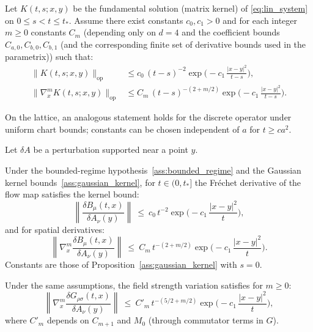 \begin{proposition}\label{ass:gaussian_kernel}
Let $K(t,s;x,y)$ be the fundamental solution (matrix kernel) of \eqref{eq:lin_system} on $0\le s<t\le t_\ast$.
Assume there exist constants $c_0,c_1>0$ and for each integer $m\ge 0$ constants $C_m$ (depending only on $d=4$ and the coefficient bounds
$C_{a,0},C_{b,0},C_{b,1}$ (and the corresponding finite set of derivative bounds used in the parametrix)) such that:
\begin{align}
\|K(t,s;x,y)\|_{\mathrm{op}}
&\le c_0\,(t-s)^{-2}\exp\!\Big(-c_1\,\frac{|x-y|^2}{t-s}\Big),\label{eq:K_gauss}\\
\|\nabla_x^m K(t,s;x,y)\|_{\mathrm{op}}
&\le C_m\,(t-s)^{-(2+m/2)}\exp\!\Big(-c_1\,\frac{|x-y|^2}{t-s}\Big).\label{eq:K_der_gauss}
\end{align}
\end{proposition}

On the lattice, an analogous statement holds for the discrete operator under uniform chart bounds; constants can be chosen independent of $a$ for $t\ge c a^2$.

Let $\delta A$ be a perturbation supported near a point $y$.

\begin{theorem}\label{thm:first_var}
Under the bounded-regime hypothesis~\ref{ass:bounded_regime} and the Gaussian kernel bounds~\ref{ass:gaussian_kernel},
for $t\in(0,t_\ast]$ the Fr\'echet derivative of the flow map satisfies the kernel bound:
\[
\left\|\frac{\delta B_\mu(t,x)}{\delta A_\nu(y)}\right\|
\ \le\ c_0\,t^{-2}\exp\!\Big(-c_1\,\frac{|x-y|^2}{t}\Big),
\]
and for spatial derivatives:
\[
\left\|\nabla_x^m\frac{\delta B_\mu(t,x)}{\delta A_\nu(y)}\right\|
\ \le\ C_m\,t^{-(2+m/2)}\exp\!\Big(-c_1\,\frac{|x-y|^2}{t}\Big).
\]
Constants are those of Proposition~\ref{ass:gaussian_kernel} with $s=0$.
\end{theorem}

\begin{corollary}\label{cor:first_var_G}
Under the same assumptions, the field strength variation satisfies for $m\ge 0$:
\[
\left\|\nabla_x^m\frac{\delta G_{\rho\sigma}(t,x)}{\delta A_\nu(y)}\right\|
\ \le\ C'_m\,t^{-(5/2+m/2)}\exp\!\Big(-c_1\,\frac{|x-y|^2}{t}\Big),
\]
where $C'_m$ depends on $C_{m+1}$ and $M_0$ (through commutator terms in $G$).
\end{corollary}

